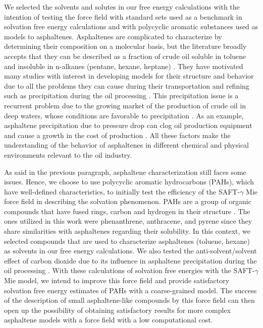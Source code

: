 We selected the solvents and solutes in our free energy calculations with the intention of testing the force field with standard sets used as a benchmark in solvation free energy calculations and with polycyclic aromatic substances used as models to asphaltenes. Asphaltenes are complicated to characterize by determining their composition on a molecular basis, but the literature broadly accepts that they can be described as a fraction of crude oil soluble in toluene and insoluble in n-alkanes (pentane, hexane, heptane) \cite{SJOBLOM2003399}. They have motivated many studies with interest in developing models for their structure and behavior due to all the problems they can cause during their transportation and refining such as precipitation during the oil processing \cite{SJOBLOM20151}. This precipitation issue is a recurrent problem due to the growing market of the production of crude oil in deep waters, whose conditions are favorable to precipitation \cite{AIC:AIC10243}. As an example, asphaltene precipitation due to pressure drop can clog oil production equipment and cause a growth in the cost of production \cite{doi:10.1021/ef010047l}. All these factors make the understanding of the behavior of asphaltenes in different chemical and physical environments relevant to the oil industry. 

As said in the previous paragraph, asphaltene characterization still faces some issues. Hence, we choose to use polycyclic aromatic hydrocarbons (PAHs), which have well-defined characteristics, to initially test the efficiency of the SAFT-$\gamma$ Mie force field in describing the solvation phenomenon. PAHs are a group of organic compounds that have fused rings, carbon and hydrogen in their structure \cite{RAVINDRA20082895}. The ones utilized in this work were phenanthrene, anthracene, and pyrene since they share similarities with asphaltenes regarding their solubility. In this context,  we selected compounds that are used to characterize asphaltenes (toluene, hexane) as solvents in our free energy calculations. We also tested the anti-solvent/solvent effect of carbon dioxide due to its influence in asphaltene precipitation during the oil processing \cite{SOROUSH2014405}. With these calculations of solvation free energies with the SAFT-$\gamma$ Mie model, we intend to improve this force field and provide satisfactory solvation free energy estimates of PAHs with a coarse-grained model. The success of the description of small asphaltene-like compounds by this force field can then open up the possibility of obtaining satisfactory results for more complex asphaltene models with a force field with a low computational cost.

